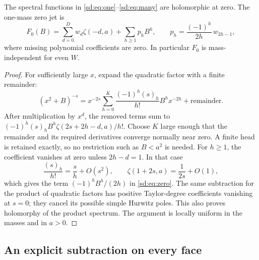 \begin{lemma}
\label{sd:lem:zero}
The spectral functions in \eqref{sd:eq:one}--\eqref{sd:eq:many} are
holomorphic at zero.  The one-mass zero jet is
\begin{equation}\label{sd:eq:zero}
 F_0(B)=\sum_{d=0}^{D}w_d\zeta(-d,a)
           +\sum_{h\ge1}p_h B^h,\qquad
 p_h=\frac{(-1)^h}{2h}\,w_{2h-1},
\end{equation}
where missing polynomial coefficients are zero.  In particular $F_0$
is mass-independent for even $W$.
\end{lemma}
\begin{proof}
For sufficiently large $x$, expand the quadratic factor with a finite
remainder:
\[
 (x^2+B)^{-s}=x^{-2s}\sum_{h=0}^{K}
                 \frac{(-1)^h(s)_h}{h!}B^h x^{-2h}
                  +\text{remainder}.
\]
After multiplication by $x^d$, the removed terms sum to
$(-1)^h(s)_hB^h\zeta(2s+2h-d,a)/h!$.  Choose $K$ large enough
that the remainder and its required derivatives converge normally near
zero.  A finite head is retained exactly, so no restriction such as
$B<a^2$ is needed.  For $h\ge1$, the coefficient vanishes at zero
unless $2h-d=1$.  In that case
\[
 \frac{(s)_h}{h!}=\frac{s}{h}+O(s^2),\qquad
 \zeta(1+2s,a)=\frac1{2s}+O(1),
\]
which gives the term $(-1)^h B^h/(2h)$ in \eqref{sd:eq:zero}.
The same subtraction for the product of quadratic factors has positive
Taylor-degree coefficients vanishing at $s=0$; they cancel its possible
simple Hurwitz poles.  This also proves holomorphy of the product
spectrum.  The argument is locally uniform in the masses and in $a>0$.
\end{proof}

\subsection{An explicit subtraction on every face}
\label{sd:subsec:faces}

